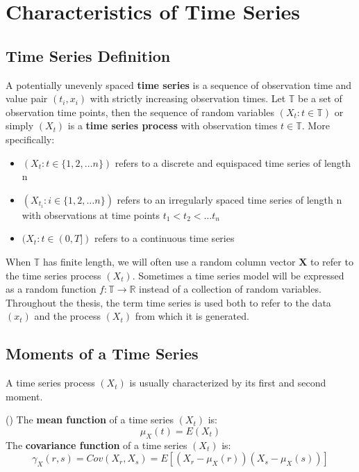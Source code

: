 \usepackage{amsfonts}%


\chapter{Characteristics of Time Series}

\section{Time Series Definition}

    A potentially unevenly spaced \textbf{time series} is a sequence of observation time and value pair $(t_i, x_i)$
    with strictly increasing observation times.
    Let $\mathbb{T}$ be a set of observation time points,
    then the sequence of random variables $(X_t: t \in \mathbb{T})$ or simply $(X_t)$ is a \textbf{time series process}
    with observation times $t \in \mathbb{T}$.
    More specifically:
\begin{itemize}
    \item $(X_t: t \in \{1, 2, \dots n\})$ refers to a discrete and equispaced time series of length n
    \item $(X_{t_i}: i \in \{1, 2, \dots n\})$ refers to an irregularly spaced time series of length n
    with observations at time points $t_1 < t_2 < \dots t_n$
    \item $(X_{t}: t \in (0, T])$ refers to a continuous time series
\end{itemize}

When $\mathbb{T}$ has finite length, we will often use a random column vector $\mathbf{X}$ to refer to
the time series process $(X_t)$.
Sometimes a time series model will be expressed as a random function $f: \mathbb{T} \to \mathbb{R}$ instead
of a collection of random variables.
Throughout the thesis, the term time series is used both to refer to the data $(x_t)$ and the process $(X_t)$ from which it is generated.

\section{Moments of a Time Series}

A time series process $(X_t)$ is usually characterized by its first and second moment.

\begin{definition}(\citeauthor{brockwell_introduction_2016})
    The \textbf{mean function} of a time series $(X_t)$ is:
    \[
        \mu_X(t) = E(X_t)
    \]
    The \textbf{covariance function} of a time series $(X_t)$ is:
    \[
        \gamma_X(r,s) = Cov(X_r, X_s) = E[(X_r - \mu_X(r))(X_s-\mu_X(s))]
    \]
\end{definition}

